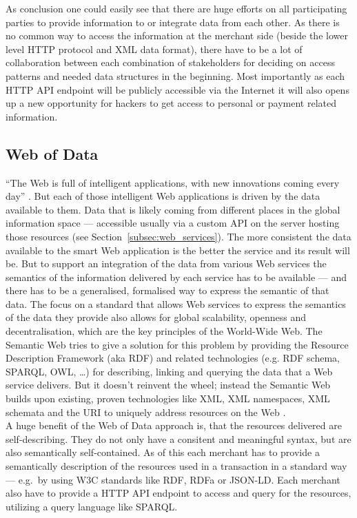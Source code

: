 As conclusion one could easily see that there are huge efforts on all participating parties to provide information to or integrate data from each other. As there is no common way to access the information at the merchant side (beside the lower level HTTP protocol and XML data format), there have to be a lot of collaboration between each combination of stakeholders for deciding on access patterns and needed data structures in the beginning. Most importantly as each \gls{HTTP} \gls{API} endpoint will be publicly accessible via the Internet it will also opens up a new opportunity for hackers to get access to personal or payment related information.


\subsection{Web of Data}
\label{subsec:web_data}

``The Web is full of intelligent applications, with new innovations coming every day'' \citep{allemang2011semantic}. But each of those intelligent Web applications is driven by the data available to them. Data that is likely coming from different places in the global information space — accessible usually via a custom API on the server hosting those resources (see Section~\ref{subsec:web_services}). The more consistent the data available to the smart Web application is the better the service and its result will be. But to support an integration of the data from various Web services the semantics of the information delivered by each service has to be available — and there has to be a generalised, formalised way to express the semantic of that data. The focus on a standard that allows Web services to express the semantics of the data they provide also allows for global scalability, openness and decentralisation, which are the key principles of the World-Wide Web. The Semantic Web tries to give a solution for this problem by providing the Resource Description Framework (aka \gls{RDF}) and related technologies (e.g. RDF schema, SPARQL, OWL, \ldots) for describing, linking and querying the data that a Web service delivers. But it doesn’t reinvent the wheel; instead the Semantic Web builds upon existing, proven technologies like XML, XML namespaces, XML schemata and the \gls{URI} to uniquely address resources on the Web \citep{allemang2011semantic}. \\

A huge benefit of the Web of Data approach is, that the resources delivered are self-describing. They do not only have a consitent and meaningful syntax, but are also semantically self-contained. As of this each merchant has to provide a semantically description of the resources used in a transaction in a standard way --- e.g.\ by using \gls{W3C} standards like \gls{RDF}, \gls{RDFa} or \gls{JSON-LD}. Each merchant also have to provide a \gls{HTTP} \gls{API} endpoint to access and query for the resources, utilizing a query language like \gls{SPARQL}. \\

